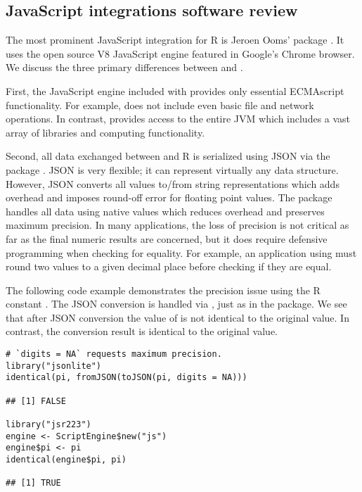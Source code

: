 \hypertarget{javascript-integrations}{}
\subsection{JavaScript integrations software review}

The most prominent JavaScript integration for R is Jeroen Ooms'  package \citeyearpar{v8pkg}. It uses the open source V8 JavaScript engine \citep{v8javascript} featured in Google's Chrome browser. We discuss the three primary differences between  and .

First, the JavaScript engine included with  provides only essential ECMAscript functionality. For example,  does not include even basic file and network operations. In contrast,  provides access to the entire JVM which includes a vast array of libraries and computing functionality.

Second, all data exchanged between  and R is serialized using JSON via the  package \citep{jsonlite}. JSON is very flexible; it can represent virtually any data structure. However, JSON converts all values to/from string representations which adds overhead and imposes round-off error for floating point values. The  package handles all data using native values which reduces overhead and preserves maximum precision. In many applications, the loss of precision is not critical as far as the final numeric results are concerned, but it does require defensive programming when checking for equality. For example, an application using  must round two values to a given decimal place before checking if they are equal. 

The following code example demonstrates the precision issue using the R constant . The JSON conversion is handled via , just as in the  package. We see that after JSON conversion the value of  is not identical to the original value. In contrast, the  conversion result is identical to the original value.

\begin{verbatim}
# `digits = NA` requests maximum precision.
library("jsonlite")
identical(pi, fromJSON(toJSON(pi, digits = NA)))

## [1] FALSE

library("jsr223")
engine <- ScriptEngine$new("js")
engine$pi <- pi
identical(engine$pi, pi)

## [1] TRUE
\end{verbatim}

